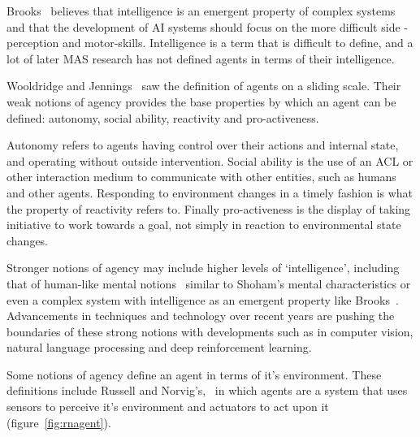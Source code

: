 \documentclass[]{final_report}
\begin{document}
Brooks~\cite{brooks1991intelligence} believes that intelligence is an emergent property of complex systems and that the development of AI systems should focus on the more difficult side - perception and motor-skills. Intelligence is a term that is difficult to define, and a lot of later MAS research has not defined agents in terms of their intelligence.\par Wooldridge and Jennings~\cite{wooldridge_jennings_1995} saw the definition of agents on a sliding scale. Their weak notions of agency provides the base properties by which an agent can be defined: autonomy, social ability, reactivity and pro-activeness.\par 
Autonomy refers to agents having control over their actions and internal state, and operating without outside intervention. Social ability is the use of an ACL or other interaction medium to communicate with other entities, such as humans and other agents. Responding to environment changes in a timely fashion is what the property of reactivity refers to. Finally pro-activeness is the display of taking initiative to work towards a goal, not simply in reaction to environmental state changes.\par 
Stronger notions of agency may include higher levels of `intelligence', including that of human-like mental notions~\cite{wooldridge_jennings_1995} similar to Shoham's mental characteristics or even a complex system with intelligence as an emergent property like Brooks~\cite{brooks1991intelligence}. Advancements in techniques and technology over recent years are pushing the boundaries of these strong notions with developments such as in computer vision, natural language processing and deep reinforcement learning.\par 
Some notions of agency define an agent in terms of it's environment. These definitions include Russell and Norvig's,~\cite{russell2016artificial} in which agents are a system that uses sensors to perceive it's environment and actuators to act upon it (figure~\ref{fig:rnagent}).
\end{document}
